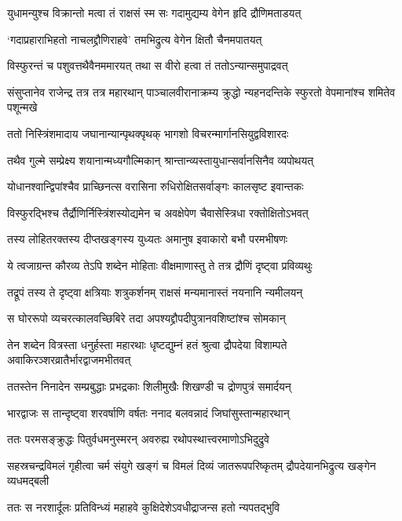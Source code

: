 \twolineshloka
{युधामन्युश्च विक्रान्तो मत्वा तं राक्षसं स्म सः}
{गदामुद्यम्य वेगेन हृदि द्रौणिमताडयत्}


\twolineshloka
{`गदाप्रहाराभिहतो नाचलद्द्रौणिराहवे'}
{तमभिद्रुत्य वेगेन क्षितौ चैनमपातयत्}


\twolineshloka
{विस्फुरन्तं च पशुवत्तथैवैनममारयत्}
{तथा स वीरो हत्वा तं ततोऽन्यान्समुपाद्रवत्}


\threelineshloka
{संसुप्तानेव राजेन्द्र तत्र तत्र महारथान्}
{पाञ्चालवीरानाक्रम्य क्रुद्धो न्यहनदन्तिके}
{स्फुरतो वेपमानांश्च शमितेव पशून्मखे}


\twolineshloka
{ततो निस्त्रिंशमादाय जघानान्यान्पृथक्पृथक्}
{भागशो विचरन्मार्गानसियुद्वविशारदः}


\twolineshloka
{तथैव गुल्मे सम्प्रेक्ष्य शयानान्मध्यगौल्मिकान्}
{श्रान्तान्व्यस्तायुधान्सर्वानसिनैव व्यपोथयत्}


\twolineshloka
{योधानश्वान्द्विपांश्चैव प्राच्छिनत्स वरासिना}
{रुधिरोक्षितसर्वाङ्गः कालसृष्ट इवान्तकः}


\twolineshloka
{विस्फुरद्भिश्च तैर्द्रौणिर्निस्त्रिंशस्योद्यमेन च}
{अवक्षेपेण चैवासेस्त्रिधा रक्तोक्षितोऽभवत्}


\twolineshloka
{तस्य लोहितरक्तस्य दीप्तखङ्गस्य युध्यतः}
{अमानुष इवाकारो बभौ परमभीषणः}


\twolineshloka
{ये त्वजाग्रन्त कौरव्य तेऽपि शब्देन मोहिताः}
{वीक्षमाणास्तु ते तत्र द्रौणिं दृष्ट्वा प्रविव्यथुः}


\twolineshloka
{तद्रूपं तस्य ते दृष्ट्वा क्षत्रियाः शत्रुकर्शनम्}
{राक्षसं मन्यमानास्तं नयनानि न्यमीलयन्}


\twolineshloka
{स घोररूपो व्यचरत्कालवच्छिबिरे तदा}
{अपश्यद्द्रौपदीपुत्रानवशिष्टांश्च सोमकान्}


\threelineshloka
{तेन शब्देन वित्रस्ता धनुर्हस्ता महारथाः}
{धृष्टद्युम्नं हतं श्रुत्वा द्रौपदेया विशाम्पते}
{अवाकिरञ्शरव्रातैर्भारद्वाजमभीतवत्}


\twolineshloka
{ततस्तेन निनादेन सम्प्रबुद्धाः प्रभद्रकाः}
{शिलीमुखैः शिखण्डी च द्रोणपुत्रं समार्दयन्}


\twolineshloka
{भारद्वाजः स तान्दृष्ट्वा शरवर्षाणि वर्षतः}
{ननाद बलवन्नादं जिघांसुस्तान्महारथान्}


\twolineshloka
{ततः परमसङ्क्रुद्धः पितुर्वधमनुस्मरन्}
{अवरुह्य रथोपस्थात्त्वरमाणोऽभिदुद्रुवे}


\threelineshloka
{सहस्रचन्द्रविमलं गृहीत्वा चर्म संयुगे}
{खङ्गं च विमलं दिव्यं जातरूपपरिष्कृतम्}
{द्रौपदेयानभिद्रुत्य खङ्गेन व्यधमद्बली}


\twolineshloka
{ततः स नरशार्दूलः प्रतिविन्ध्यं महाहवे}
{कुक्षिदेशेऽवधीद्राजन्स हतो न्यपतद्भुवि}


